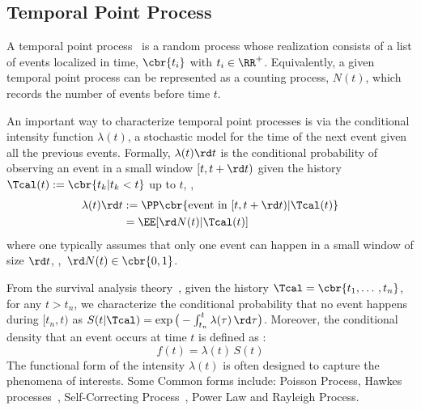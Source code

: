 \documentclass{article}
\begin{document}
\subsection{Temporal Point Process}
A temporal point process~\cite{CoxLew2006} is a random process whose realization consists of a list of events localized in time, $\cbr{t_i}$ with $t_i \in \RR^+$. Equivalently, a given temporal point process can be re\-pre\-sen\-ted as a counting process, $N(t)$, which records the number of events before time $t$.

An important way to characterize temporal point processes is via the conditional intensity function $\lambda(t)$, a stochastic model for the time of the next event given all the previous events. Formally, $\lambda(t)\rd t$ is the conditional probability of observing an event in a small window $[t, t+\rd t)$ given the history $\Tcal(t):=\cbr{t_k|t_k<t}$ up to $t$, \ie,
\vspace{-0.2cm}
\begin{equation}
\begin{split}
\lambda(t)\rd t &:= \PP\cbr{\text{event in }[t, t+\rd t)|\Tcal(t)} \\
&= \EE[\rd N(t) | \Tcal(t)]
\end{split} 
\end{equation}
where one typically assumes that only one event can happen in a small window of size $\rd t$, \ie,~$\rd N(t) \in \cbr{0,1}$. 

From the survival analysis theory~\cite{AalBorGje08}, given the history $\Tcal=\cbr{t_1,\dotso, t_n}$, for any $t > t_n$, we characterize the conditional probability that no event happens during $[t_n, t)$ as $ S(t|\Tcal) = \exp\big(-\int_{t_n}^{t} \lambda(\tau) \, \rd\tau \big)$. Moreover, the conditional density that an event occurs at time $t$ is defined as :
\vspace{-0.3cm}
\begin{equation}
f(t) = \lambda(t)\, S(t)	
\label{eq:f}
\end{equation}
The functional form of the intensity $\lambda(t)$ is often designed to capture the phenomena of interests. Some Common forms include:
Poisson Process, Hawkes processes~\cite{Hawkes71}, Self-Correcting Process~\cite{IshWes79}, Power Law and Rayleigh Process.

\end{document}
